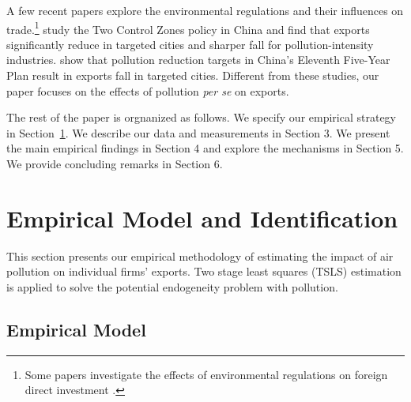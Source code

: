 \documentclass[12pt]{article}
\begin{document}
A few recent papers explore the environmental regulations and their
influences on trade.\footnote{%
Some papers investigate the effects of environmental regulations on foreign
direct investment \citep{dean2009foreign,cai2016does}.} \cite%
{hering2014environmental} study the Two Control Zones policy in China and
find that exports significantly reduce in targeted cities and sharper fall
for pollution-intensity industries. \cite{shi2018environmental} show that
pollution reduction targets in China's Eleventh Five-Year Plan result in
exports fall in targeted cities. Different from these studies, our paper
focuses on the effects of pollution \textit{per se} on exports.

The rest of the paper is orgnanized as follows. We specify our empirical
strategy in Section~\ref{sec:empirical_strategy}. We describe our data and
measurements in Section 3. We present the main empirical findings in Section
4 and explore the mechanisms in Section 5. We provide concluding remarks in
Section 6.

\section{Empirical Model and Identification}

\label{sec:empirical_strategy} This section presents our empirical
methodology of estimating the impact of air pollution on individual firms'
exports. Two stage least squares (TSLS) estimation is applied to solve the
potential endogeneity problem with pollution.

\subsection{Empirical Model}
\end{document}
